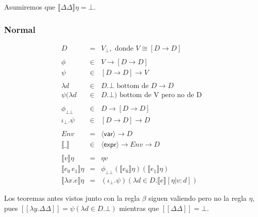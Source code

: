 \documentclass[12pt,a4paper]{article}
\newcommand{\PN}{\par\noindent}
\newcommand{\nonterminal}[1]{\langle \mathsf{#1} \rangle}
\newcommand{\expr}{\nonterminal{expr}}
\newcommand{\var}{\nonterminal{var}}
\newcommand{\Env}{\mathit{Env}}
\newcommand{\botbot}{\bot\!\!\!\bot}
\newcommand{\se}[1]{[\![#1]\!]}
\begin{document}
    \PN Asumiremos que $\llbracket\Delta \Delta\rrbracket\eta = \bot$.

    \subsubsection{Normal}
      \begin{eqnarray*}
        D &=& V_\bot, \text{ donde } V \cong [D \to  D] \\ \\
        \phi &\in& V \to  [D \to  D] \\
        \psi &\in& [D \to  D] \to  V \\ \\ 
        \lambda d &\in& D. \bot \text{ bottom de } D \rightarrow D \\
        \psi(\lambda d &\in& D. \bot) \text{ bottom de V pero no de D} \\ \\
        \phi_{\botbot} &\in& D \to  [D \to  D] \\
        \iota_\bot . \psi &\in& [D \to  D] \to  D \\ \\
        \Env &=& \var \to  D \\
        \llbracket\_\rrbracket &\in& \expr \to  Env \to  D \\ \\
        \llbracket v \rrbracket\eta &=& \eta v \\
        \llbracket e_0\, e_1\rrbracket\eta &=& \phi_{\botbot} (\llbracket e_0\rrbracket\eta) (\llbracket e_1\rrbracket\eta) \\
        \llbracket\lambda x.e\rrbracket\eta &=& (\iota_\bot . \psi)(\lambda d \in D. \llbracket e\rrbracket[\eta|v:d])
      \end{eqnarray*}

      \PN Los teoremas antes vistos junto con la regla $\beta$ siguen valiendo pero no la regla $\eta$, pues $\se{\lambda y. \Delta\Delta} = \psi(\lambda d \in D.\bot)$ mientras que $\se{\Delta\Delta} = \bot$.
    
\end{document}

